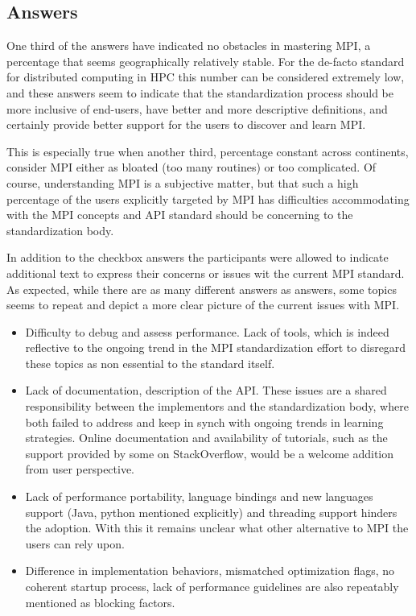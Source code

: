 
\subsection{Answers}


One third of the answers have indicated no obstacles in mastering MPI, a percentage that seems geographically relatively stable. For the de-facto standard for distributed computing in HPC this number can be considered extremely low, and these answers seem to indicate that the standardization process should be more inclusive of end-users, have better and more descriptive definitions, and certainly provide better support for the users to discover and learn MPI.

This is especially true when another third, percentage constant across continents, consider MPI either as bloated (too many routines) or too complicated. Of course, understanding MPI is a subjective matter, but that such a high percentage of the users explicitly targeted by MPI has difficulties accommodating with the MPI concepts and API standard should be concerning to the standardization body.

In addition to the checkbox answers the participants were allowed to indicate additional text to express their concerns or issues wit the current MPI standard. As expected, while there are as many different answers as answers, some topics seems to repeat and depict a more clear picture of the current issues with MPI.

\begin{itemize}
\item Difficulty to debug and assess performance. Lack of tools, which is indeed reflective to the ongoing trend in the MPI standardization effort to disregard these topics as non essential to the standard itself.
\item Lack of documentation, description of the API. These issues are a shared responsibility between the implementors and the standardization body, where both failed to address and keep in synch with ongoing trends in learning strategies. Online documentation and availability of tutorials, such as the support provided by some on StackOverflow, would be a welcome addition from user perspective.
\item Lack of performance portability, language bindings and new languages support (Java, python mentioned explicitly) and threading support hinders the adoption. With this it remains unclear what other alternative to MPI the users can rely upon.
\item Difference in implementation behaviors, mismatched optimization flags, no coherent startup process, lack of performance guidelines are also repeatably mentioned as blocking factors.
\end{itemize}


